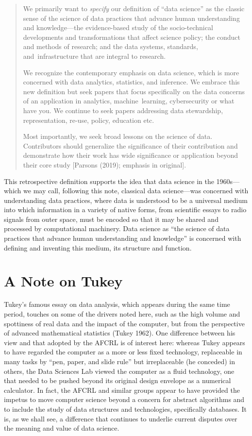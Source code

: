 \documentclass[
  letterpaper,
]{report}
\begin{document}
\begin{quote}
We primarily want to \emph{specify} our definition of ``data science''
as the classic sense of the science of data practices that advance human
understanding and knowledge---the evidence-based study of the
socio-technical developments and transformations that affect science
policy; the conduct and methods of research; and the data systems,
standards, and~infrastructure that are integral to research.

We recognize the contemporary emphasis on data science, which is more
concerned with data analytics, statistics, and inference. We embrace
this new definition but seek papers that focus specifically on the data
concerns of an application in analytics, machine~learning, cybersecurity
or what have you. We continue to seek papers addressing data
stewardship, representation, re-use, policy, education etc.

Most importantly, we seek broad lessons on the science of data.
Contributors should generalize the significance of their contribution
and demonstrate how their work has wide significance or application
beyond their core study {[}Parsons (2019); emphasis in original{]}.
\end{quote}

This retrospective definition supports the idea that data science in the
1960s---which we may call, following this note, classical data
science---was concerned with understanding data practices, where data is
understood to be a universal medium into which information in a variety
of native forms, from scientific essays to radio signals from outer
space, must be encoded so that it may be shared and processed by
computational machinery. Data science as ``the science of data practices
that advance human understanding and knowledge'' is concerned with
defining and inventing this medium, its structure and function.

\hypertarget{a-note-on-tukey}{%
\section{A Note on Tukey}\label{a-note-on-tukey}}

Tukey's famous essay on data analysis, which appears during the same
time period, touches on some of the drivers noted here, such as the high
volume and spottiness of real data and the impact of the computer, but
from the perspective of advanced mathematical statistics (Tukey 1962).
One difference between his view and that adopted by the AFCRL is of
interest here: whereas Tukey appears to have regarded the computer as a
more or less fixed technology, replaceable in many tasks by ``pen,
paper, and slide rule'' but irreplaceable (he conceded) in others, the
Data Sciences Lab viewed the computer as a fluid technology, one that
needed to be pushed beyond its original design envelope as a numerical
calculator. In fact, the AFCRL and similar groups appear to have
provided the impetus to move computer science beyond a concern for
abstract algorithms and to include the study of data structures and
technologies, specifically databases. It is, as we shall see, a
difference that continues to underlie current disputes over the meaning
and value of data science.
\end{document}
